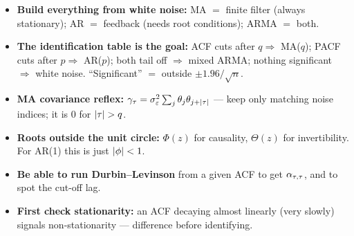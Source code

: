 \documentclass[11pt]{article}
\begin{document}
\begin{retenir}
\begin{itemize}
  \item \textbf{Build everything from white noise:} MA $=$ finite filter (always stationary); AR $=$ feedback (needs root conditions); ARMA $=$ both.
  \item \textbf{The identification table is the goal:} ACF cuts after $q\Rightarrow$ MA($q$); PACF cuts after $p\Rightarrow$ AR($p$); both tail off $\Rightarrow$ mixed ARMA; nothing significant $\Rightarrow$ white noise. ``Significant'' $=$ outside $\pm1.96/\sqrt n$.
  \item \textbf{MA covariance reflex:} $\gamma_\tau=\sigma_\varepsilon^2\sum_j\theta_j\theta_{j+\left\lvert \tau \right\rvert}$ --- keep only matching noise indices; it is $0$ for $\left\lvert \tau \right\rvert>q$.
  \item \textbf{Roots outside the unit circle:} $\Phi(z)$ for causality, $\Theta(z)$ for invertibility. For AR(1) this is just $\left\lvert \phi \right\rvert<1$.
  \item \textbf{Be able to run Durbin--Levinson} from a given ACF to get $\alpha_{\tau,\tau}$, and to spot the cut-off lag.
  \item \textbf{First check stationarity:} an ACF decaying almost linearly (very slowly) signals non-stationarity --- difference before identifying.
\end{itemize}
\end{retenir}
\end{document}
